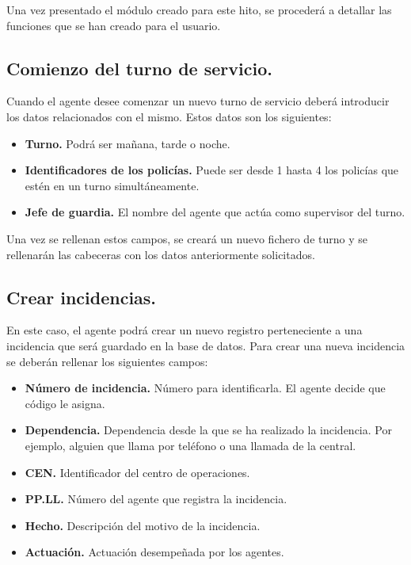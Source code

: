 Una vez presentado el módulo creado para este hito, se procederá a detallar las funciones que se han creado para el usuario.

\subsection{Comienzo del turno de servicio.}
Cuando el agente desee comenzar un nuevo turno de servicio deberá introducir los datos relacionados con el mismo. Estos datos son los siguientes:

\begin{itemize}
	\item \textbf{Turno.} Podrá ser mañana, tarde o noche.
	\item \textbf{Identificadores de los policías.} Puede ser desde 1 hasta 4 los policías que estén en un turno simultáneamente.
	\item \textbf{Jefe de guardia.} El nombre del agente que actúa como supervisor del turno.
\end{itemize}

Una vez se rellenan estos campos, se creará un nuevo fichero de turno y se rellenarán las cabeceras con los datos anteriormente solicitados.

\subsection{Crear incidencias.}

En este caso, el agente podrá crear un nuevo registro perteneciente a una incidencia que será guardado en la base de datos. Para crear una nueva
incidencia se deberán rellenar los siguientes campos:

\begin{itemize}
	\item \textbf{Número de incidencia.} Número para identificarla. El agente decide que código le asigna.
	\item \textbf{Dependencia.} Dependencia desde la que se ha realizado la incidencia. Por ejemplo, alguien que llama por teléfono o una llamada de la central.
	\item \textbf{CEN.} Identificador del centro de operaciones.
	\item \textbf{PP.LL.} Número del agente que registra la incidencia.
	\item \textbf{Hecho.} Descripción del motivo de la incidencia.
	\item \textbf{Actuación.} Actuación desempeñada por los agentes.
\end{itemize}

